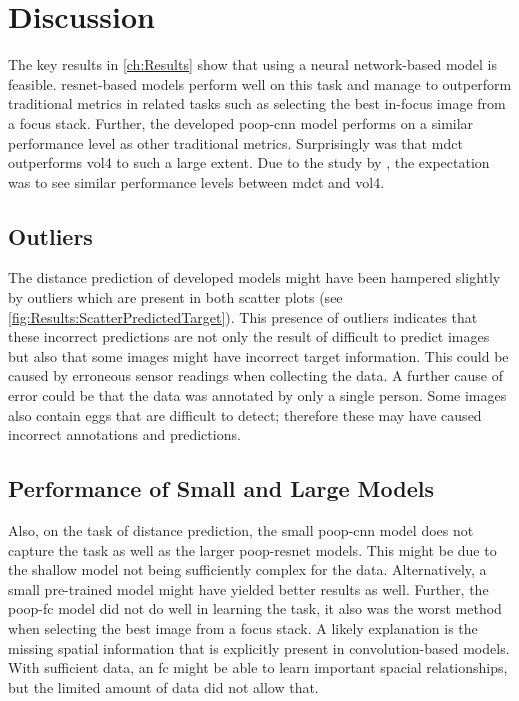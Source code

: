 \chapter{Discussion}
\label{ch:Discussion}

The key results in \autoref{ch:Results} show that using a neural network-based model is feasible. \Ac{resnet}-based models perform well on this task and manage to outperform traditional metrics in related tasks such as selecting the best in-focus image from a focus stack. Further, the developed \ac{poop}-\ac{cnn} model performs on a similar performance level as other traditional metrics. Surprisingly was that \ac{mdct} outperforms \ac{vol4} to such a large extent. Due to the study by \textcite{mateos-perez2012comparative}, the expectation was to see similar performance levels between \ac{mdct} and \ac{vol4}.

\section{Outliers}
\label{ch:Discussion:Outliers}

The distance prediction of developed models might have been hampered slightly by outliers which are present in both scatter plots (see \autoref{fig:Results:ScatterPredictedTarget}). This presence of outliers indicates that these incorrect predictions are not only the result of difficult to predict images but also that some images might have incorrect target information. This could be caused by erroneous sensor readings when collecting the data. A further cause of error could be that the data was annotated by only a single person. Some images also contain eggs that are difficult to detect; therefore these may have caused incorrect annotations and predictions.

\section{Performance of Small and Large Models}
\label{ch:Discussion:SmallandLarge}

Also, on the task of distance prediction, the small \ac{poop}-\ac{cnn} model does not capture the task as well as the larger \ac{poop}-\ac{resnet} models. This might be due to the shallow model not being sufficiently complex for the data. Alternatively, a small pre-trained model might have yielded better results as well. Further, the \ac{poop}-\ac{fc} model did not do well in learning the task, it also was the worst method when selecting the best image from a focus stack. A likely explanation is the missing spatial information that is explicitly present in convolution-based models. With sufficient data, an \acs{fc} might be able to learn important spacial relationships, but the limited amount of data did not allow that.

